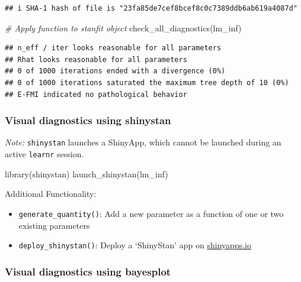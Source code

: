 \documentclass[
  11pt,
]{article}
\newenvironment{Shaded}{\begin{snugshade}}{\end{snugshade}}
\newcommand{\CommentTok}[1]{\textcolor[rgb]{0.56,0.35,0.01}{\textit{#1}}}
\newcommand{\FunctionTok}[1]{\textcolor[rgb]{0.00,0.00,0.00}{#1}}
\newcommand{\NormalTok}[1]{#1}
\providecommand{\tightlist}{%
  \setlength{\itemsep}{0pt}\setlength{\parskip}{0pt}}
\begin{document}
\begin{verbatim}
## i SHA-1 hash of file is "23fa85de7cef8bcef8c0c7389ddb6ab619a4087d"
\end{verbatim}

\begin{Shaded}
\begin{Highlighting}[]
\CommentTok{\# Apply function to stanfit object}
\FunctionTok{check\_all\_diagnostics}\NormalTok{(lm\_inf)}
\end{Highlighting}
\end{Shaded}

\begin{verbatim}
## n_eff / iter looks reasonable for all parameters
## Rhat looks reasonable for all parameters
## 0 of 1000 iterations ended with a divergence (0%)
## 0 of 1000 iterations saturated the maximum tree depth of 10 (0%)
## E-FMI indicated no pathological behavior
\end{verbatim}

\hypertarget{visual-diagnostics-using-shinystan}{%
\subsubsection{Visual diagnostics using shinystan}\label{visual-diagnostics-using-shinystan}}

\emph{Note:} \texttt{shinystan} launches a ShinyApp, which cannot be launched during an
active \texttt{learnr} session.

\begin{Shaded}
\begin{Highlighting}[]
\FunctionTok{library}\NormalTok{(shinystan)}
\FunctionTok{launch\_shinystan}\NormalTok{(lm\_inf)}
\end{Highlighting}
\end{Shaded}

Additional Functionality:

\begin{itemize}
\tightlist
\item
  \texttt{generate\_quantity()}: Add a new parameter as a function of one or two existing parameters
\item
  \texttt{deploy\_shinystan()}: Deploy a `ShinyStan' app on \href{https://www.shinyapps.io/}{shinyapps.io}
\end{itemize}

\hypertarget{visual-diagnostics-using-bayesplot}{%
\subsubsection{\texorpdfstring{Visual diagnostics using \textbf{bayesplot}}{Visual diagnostics using bayesplot}}\label{visual-diagnostics-using-bayesplot}}
\end{document}
